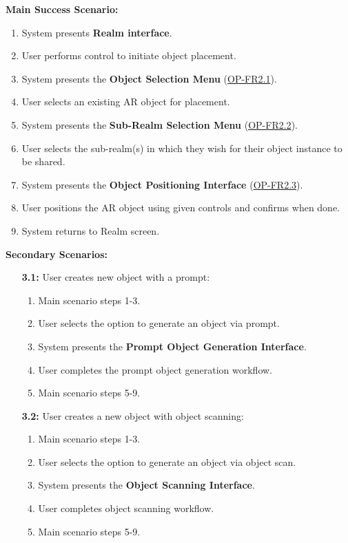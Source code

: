 \documentclass{article}
\begin{document}
\begin{enumerate}[label=\textbf{UC\arabic*}]
          \textbf{Main Success Scenario:}
          \begin{enumerate}[label=\textbf{\arabic*.}]
              \item System presents \textbf{Realm interface}.
              \item User performs control to initiate object placement.
              \item System presents the \textbf{Object Selection Menu} (\hyperref[ssub:object_placement]{OP-FR2.1}).
              \item User selects an existing AR object for placement.
              \item System presents the \textbf{Sub-Realm Selection Menu} (\hyperref[ssub:object_placement]{OP-FR2.2}).
              \item User selects the sub-realm(s) in which they wish for their object instance to be shared.
              \item System presents the \textbf{Object Positioning Interface} (\hyperref[ssub:object_placement]{OP-FR2.3}).
              \item User positions the AR object using given controls and confirms when done.
              \item System returns to Realm screen.
          \end{enumerate}

          \textbf{Secondary Scenarios:}
          \begin{itemize}
              \item[{\bf 3.1:}] User creates new object with a prompt:
                  \begin{enumerate}[label=\textbf{\arabic*.}]
                      \item Main scenario steps 1-3.
                      \item User selects the option to generate an object via prompt.
                      \item System presents the \textbf{Prompt Object Generation Interface}.
                      \item User completes the prompt object generation workflow.
                      \item Main scenario steps 5-9.
                  \end{enumerate}

              \item[{\bf 3.2:}] User creates a new object with object scanning:
                  \begin{enumerate}[label=\textbf{\arabic*.}]
                      \item Main scenario steps 1-3.
                      \item User selects the option to generate an object via object scan.
                      \item System presents the \textbf{Object Scanning Interface}.
                      \item User completes object scanning workflow.
                      \item Main scenario steps 5-9.
                  \end{enumerate}


\end{itemize}
\end{enumerate}
\end{document}
